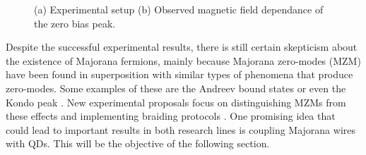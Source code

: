\begin{figure}[t]
\centering

\caption{ (a) Experimental setup (b) Observed magnetic field dependance of the zero bias peak.  \label{fig:exp}\protect{}}
\end{figure}

Despite the successful experimental results, there is still certain  skepticism about the existence of Majorana fermions, mainly because Majorana zero-modes (MZM) have been found in superposition with similar types of phenomena that produce zero-modes. Some examples of these are the Andreev bound states or even the Kondo peak \cite{lee_zero-bias_2012}. New experimental proposals focus on distinguishing MZMs from these effects and implementing  braiding protocols \cite{aasen_milestones_2016,sarma_majorana_2015,heck_coulomb-assisted_2012} . One promising idea that could lead to important results in both research lines is coupling Majorana wires with QDs. This will be the objective of the following section. 


